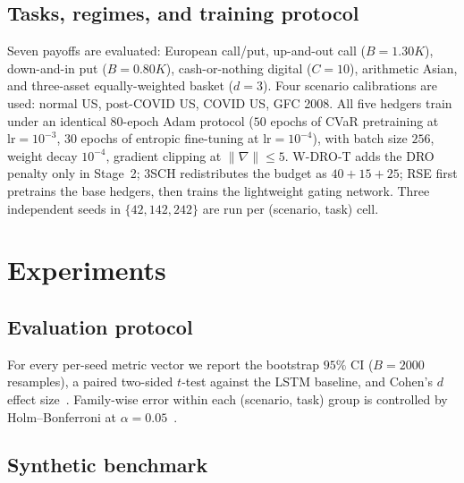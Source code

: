 \documentclass[11pt]{article}
\begin{document}
\subsection{Tasks, regimes, and training protocol}

Seven payoffs are evaluated: European call/put, up-and-out call ($B=1.30K$), down-and-in put ($B=0.80K$), cash-or-nothing digital ($C=10$), arithmetic Asian, and three-asset equally-weighted basket ($d=3$).  Four scenario calibrations are used: normal US, post-COVID US, COVID US, GFC 2008.  All five hedgers train under an identical $80$-epoch Adam protocol ($50$ epochs of CVaR pretraining at $\mathrm{lr}=10^{-3}$, $30$ epochs of entropic fine-tuning at $\mathrm{lr}=10^{-4}$), with batch size $256$, weight decay $10^{-4}$, gradient clipping at $\|\nabla\|\le5$.  W-DRO-T adds the DRO penalty only in Stage~2; 3SCH redistributes the budget as $40+15+25$; RSE first pretrains the base hedgers, then trains the lightweight gating network.  Three independent seeds in $\{42,142,242\}$ are run per (scenario, task) cell.

\section{Experiments}
\label{sec:exp}

\subsection{Evaluation protocol}

For every per-seed metric vector we report the bootstrap $95\%$ CI ($B=2000$ resamples), a paired two-sided $t$-test against the LSTM baseline, and Cohen's $d$ effect size~\citep{cohen1988statistical}.  Family-wise error within each (scenario, task) group is controlled by Holm--Bonferroni at $\alpha=0.05$~\citep{holm1979simple}.

\subsection{Synthetic benchmark}
\end{document}
